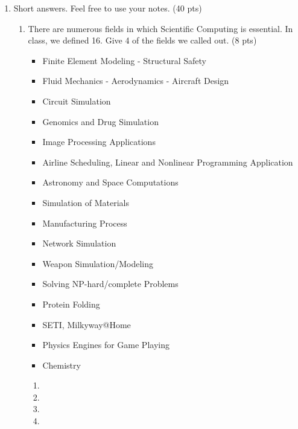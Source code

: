 \documentclass[10pt]{article}
\begin{document}
\begin{enumerate}

\item Short answers. Feel free to use your notes. (40 pts)

\begin{enumerate}
	\item There are numerous fields in which Scientific Computing is essential. In class, we defined 16.  Give 4 of the fields we called out. (8 pts)

\beginanswers
\begin{itemize}
\item Finite Element Modeling - Structural Safety
\item Fluid Mechanics - Aerodynamics - Aircraft Design
\item Circuit Simulation
\item Genomics and Drug Simulation
\item Image Processing Applications
\item Airline Scheduling, Linear and Nonlinear Programming Application
\item Astronomy and Space Computations
\item Simulation of Materials
\item Manufacturing Process
\item Network Simulation
\item Weapon Simulation/Modeling
\item Solving NP-hard/complete Problems
\item Protein Folding
\item SETI, Milkyway@Home
\item Physics Engines for Game Playing
\item Chemistry
\end{itemize}
\else
	\begin{enumerate}
	\item 
	\bigskip
	\bigskip
	\item
	\bigskip
	\bigskip
	\item 
	\bigskip
	\bigskip
	\item
	\bigskip
	\bigskip
\end{enumerate}
\fi
	\bigskip
	\bigskip


\end{enumerate}
\end{enumerate}
\end{document}
